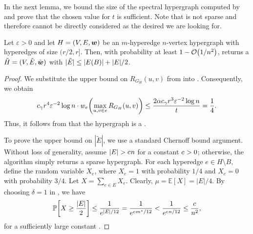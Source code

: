 In the next lemma, we bound the size of the spectral hypergraph  computed by  and prove that the chosen value for \( t \) is sufficient.
Note that  is not sparse and therefore cannot be directly considered as the desired \SpectralHypersparsifier{} we are looking for.

\begin{lemma} \label{lem:light-spectral-sparsify}
Let \( \varepsilon > 0 \) and let \( { H} = (V, E, \boldsymbol{w}) \) be an \( m \)-hyperedge \( n \)-vertex hypergraph with hyperedges of size \( (r/2, r] \).
Then, with probability at least \( 1 - \atmost{1/n^2} \),  returns a \SpectralHypersparsifier{} \( { \tilde H} = (V, \tilde{E} , \tilde{\boldsymbol{w}}) \) with \( |\tilde{E}| \leq |E({ B})| + |E| /2 \).
\end{lemma}
\begin{proof}
We substitute the upper bound on \( R_{G_H}(u, v) \) from  into .
Consequently, we obtain
\begin{equation*}
\ConstantProp r^4 \varepsilon ^{-2} \log n \cdot w_e \left( \max_{u, v \in e} R_{G_H}(u, v) \right) \leq \frac{2 \alpha \ConstantProp r^3 \varepsilon ^{-2} \log n}{t} = \frac{1}{4}.
\end{equation*}
Thus, it follows from  that the hypergraph  is a \SpectralHypersparsifier{}.


To prove the upper bound on \( | \tilde{E} | \), we use a standard Chernoff bound argument.
Without loss of generality, assume \( |E| > c_{ } n \) for a constant \( c_{ } > 0 \); otherwise, the algorithm simply returns a sparse hypergraph. 
For each hyperedge \( e \in H \setminus B \), 
 define the random variable \( X_e \), where \( X_e = 1 \) with probability \( 1/4 \) and  \( X_e = 0 \) with probability \( 3/4 \).
Let \( X = \sum _{e \in E} X_e \).
Clearly, \( \mu = \mathbb E[X] = |E|/4 \).
By choosing \( \delta = 1 \) in , we have
\begin{equation} \label{eq:whp_light_spectral_sparsify}
\mathbb P \left[X \geq \frac{|E|}{2}\right] \leq \frac{1}{e^{ |E| / 12}} = \frac{1}{e^{ \ConstantSize m^\star / 12}} < \frac{1}{e^{ \ConstantSize n / 12}}  \leq \frac{\ConstantSize}{n^2},
\end{equation}
for a sufficiently large constant \ConstantSize.
\end{proof}


